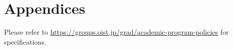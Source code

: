 

\chapter{Appendices} \label{appA}

Please refer to \url{https://groups.oist.jp/grad/academic-program-policies} for specifications.
